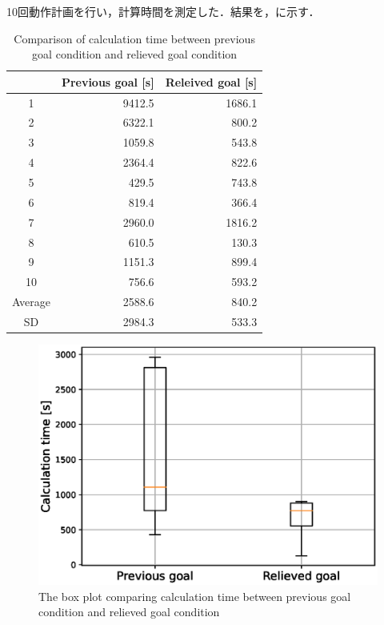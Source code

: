 \documentclass[a4paper,twoside,12pt,papersize, dvipdfmx]{iirthesis}
\begin{document}
10回動作計画を行い，計算時間を測定した．結果を，に示す．
\begin{table}[bt]
    \centering
    \caption{Comparison of calculation time between previous goal condition and relieved goal condition}
    \label{tab::planner::goalconddiff}
    \begin{tabular}{c|r r}
        ~ & Previous goal [s] & Releived goal [s]  \\ \hline
        1 & 9412.5 & 1686.1  \\ 
        2 & 6322.1 & 800.2 \\ 
        3 & 1059.8 & 543.8  \\ 
        4 & 2364.4 & 822.6  \\ 
        5 & 429.5 & 743.8 \\ 
        6 & 819.4 & 366.4  \\ 
        7 & 2960.0 & 1816.2  \\
        8 & 610.5 & 130.3  \\ 
        9 & 1151.3 & 899.4  \\ 
        10 & 756.6 & 593.2  \\ \hline
        Average & 2588.6  & 840.2  \\ \hline
        SD & 2984.3 & 533.3  \\ 
    \end{tabular}
\end{table}
\begin{figure}[bt]
\centering
\includegraphics[width=0.5\hsize]{fig/3-new-planner/3_2_1.eps}
\caption{The box plot comparing calculation time between previous goal condition and relieved goal condition}
\label{fig::planner::goalconddiff}
\end{figure}
\end{document}
